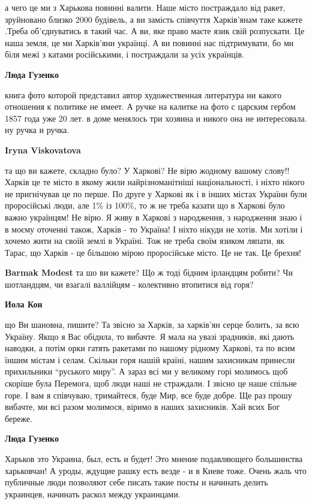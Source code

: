 \begin{itemize}
\begin{itemize}
а чего це ми з Харькова повинні валити. Наше місто постраждало від ракет,
зруйновано близко 2000 будівель, а ви замість співчуття Харків'янам таке кажете
.Треба об'єднуватись в такий час. А ви, яке право маєте язик свій розпускати. Це
наша земля, це ми Харків'яни українці. А ви повинні нас підтримувати, бо ми
біля межі з катами російськими, і постраждали за усіх українців.

\textbf{Люда Гузенко}

книга фото которой представил автор художественная литература ни какого
отношения к политике не имеет. А ручке на калитке на фото с царским гербом 1857
года уже 20 лет. в доме менялось три хозяина и никого она не интересовала. ну
ручка и ручка.

\textbf{Iryna Viskovatova} 

та що ви кажете, складно було? У Харкові? Не вірю жодному вашому слову!! Харків
це те місто в якому жили найрізноманітніші національності, і ніхто нікого не
пригнічував це по перше. По друге у Харкові як і в інших містах України були
проросійські люди, але 1\% із 100\%, то ж не треба казати що в Харкові було важно
українцям! Не вірю. Я живу в Харкові з народження, з народження знаю і в моєму
оточенні також, Харків - то Україна! І ніхто нікуди не хотів. Ми хотіли і
хочемо жити на своїй землі в Україні. Тож не треба своїм язиком ляпати, як
Тарас, що Харків - це більшою мірою проросійське місто. Це не так. Це брехня!

\textbf{Barmak Modest} та шо ви кажете? Що ж тоді бідним ірландцям робити? Чи шотландцям, чи взагалі валлійцям - колективно втопитися від горя?

\textbf{Иола Кон} 

що Ви шановна, пишите? Та звісно за Харків, за харків'ян серце болить, за всю
Україну. Якщо я Вас обідила, то вибачте. Я мала на увазі зрадників, які дають
наводки, а потім орки гатять ракетами по нашому рідному Харкові, та по всим
їншим містам і селам. Скільки горя нашій країні, нашим захисникам принесли
прихильники \enquote{руського миру}. А зараз всі ми у великому горі молимось щоб
скоріше була Перемога, щоб люди наші не страждали. І звісно це наше спільне
горе. І вам я співчуваю, тримайтеся, буде Мир, все буде добре. Ще раз прошу
вибачте, ми всі разом молимося, віримо в наших захисників. Хай всих Бог береже.

\textbf{Люда Гузенко} 

Харьков это Украина, был, есть и будет! Это мнение подавляющего большинства
харьковчан! А уроды, ждущие рашку есть везде - и в Киеве тоже. Очень жаль что
публичные люди позволяют себе писать такие посты и начинать делить украинцев,
начинать раскол между украинцами.


\end{itemize}
\end{itemize}
